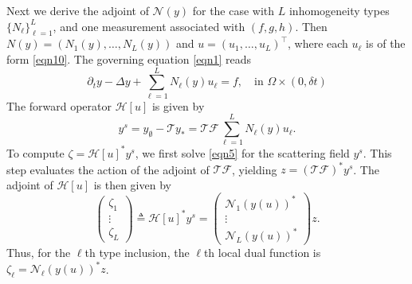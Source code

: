 \documentclass[onefignum,onetabnum]{siamart190516}
\numberwithin{equation}{section}
\begin{document}
Next we derive the adjoint of $\mathcal{N}(y)$ for the case with $L$ inhomogeneity types $\{N_{\ell}\}_{\ell=1}^{L}$, and one measurement associated with $(f, g, h)$.
Then
$N(y) = \left(N_{1}(y), \dots, N_{L}(y)\right)$ and $ u = \left(u_{1}, \dots, u_{L}\right)^{\top}$,
where each  $u_{\ell}$ is of the form \eqref{eqn10}.
The governing equation \eqref{eqn1} reads
\begin{equation*}
\partial_{t} y - \Delta y + \sum_{\ell=1}^{L} N_{\ell}(y) u_{\ell} = f, \quad \text{in } \Omega \times (0, \delta t)
\end{equation*}
The forward operator $\mathcal{H}[u]$ is given by
\begin{equation*}
y^{s} = y_{\emptyset} - \mathcal{T} y_{*} = \mathcal{T}\mathcal{F} \sum_{\ell=1}^{L} N_{\ell}(y) u_{\ell}.
\end{equation*}
To compute $\zeta = \mathcal{H}[u]^{*} y^{s}$, we first solve \eqref{eqn5} for the scattering field $y^{s}$.
This step evaluates the action of the adjoint of $\mathcal{T}\mathcal{F}$, yielding $z = \left(\mathcal{T}\mathcal{F}\right)^{*} y^{s}$.
The adjoint of $\mathcal{H}[u]$ is then given by
\begin{equation*}
\begin{pmatrix}
\zeta_{1} \\
\vdots \\
\zeta_{L}
\end{pmatrix}
\triangleq
\mathcal{H}[u]^{*}y^s
= \begin{pmatrix}
\mathcal{N}_{1}(y(u))^{*} \\
\vdots  \\
\mathcal{N}_{L}(y(u))^{*} 
\end{pmatrix}
z .
\end{equation*}
Thus, for the $\ell$th type  inclusion, the $\ell$th local dual function is $\zeta_{\ell} =\mathcal{N}_{\ell}(y(u))^{*} z$.
\end{document}
